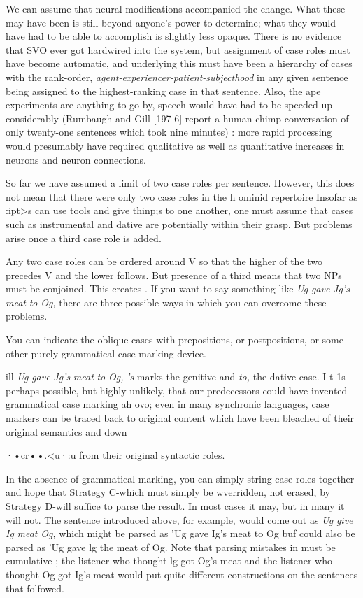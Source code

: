We can assume that neural modifications accompanied the change. What these may have been is still beyond anyone's power to determine; what they would have had to be able to accomplish is slightly less opaque. There is no evidence that SVO ever got hardwired into the system, but assignment of case roles must have become auto\-matic, and underlying this must have been a hierarchy of cases with the rank-order, \textit{agent-experiencer-patient-su}\textit{b}\textit{jecthood }in any given sen\-tence being assigned to the highest-ranking case in that sentence. Also, the ape experiments are anything to go by, speech would have had
to be speeded up considerably (Rumbaugh and Gill [197 6] report a human-chimp conversation of only twenty-one sentences which took nine minutes) : more rapid processing would presumably have required qualitative as well as quantitative increases in neurons and neuron connections.

So far we have assumed a limit of two case roles per sentence. However, this does not mean that there were only two case roles in the h ominid repertoire Insofar as :ipt{\textgreater}s can use tools and give thinp;s to one another, one must assume that cases such as instrumental and dative are potentially within their grasp. But problems arise once a third case role is added.

Any two case roles can be ordered around V so that the higher of the two precedes V and the lower follows. But presence of a third means that two NPs must be conjoined. This creates . If you want to say something like \textit{Ug} \textit{gave} \textit{Jg's} \textit{meat} \textit{to} \textit{Og,} there are three possible ways in which you can overcome these problems.

You can indicate the oblique cases with prepositions, or post\-positions, or some other purely grammatical case-marking device.


ill \textit{Ug} \textit{gave} \textit{Jg's} \textit{meat} \textit{to} \textit{Og,} \textit{'s} marks the genitive and \textit{to,} the dative case. I t 1s perhaps possible, but highly unlikely, that our predecessors could have invented grammatical case marking ah ovo; even in many syn\-chronic languages, case markers can be traced back to original content which have been bleached of their original semantics and down\-

·•cr••.{\textless}u·:u from their original syntactic roles.

In the absence of grammatical marking, you can simply string case roles together and hope that Strategy C-which must simply be wverridden, not erased, by Strategy D-will suffice to parse the result. In most cases it may, but in many it will not. The sentence introduced above, for example, would come out as \textit{Ug} \textit{give} \textit{Ig} \textit{meat} \textit{Og,} which might be parsed as 'Ug gave Ig's meat to Og buf could also be parsed as 'Ug gave lg the meat of Og. Note that parsing mistakes in  must be cumulative ; the listener who thought lg got Og's meat and the listener who thought Og got Ig's meat would put quite different con\-structions on the sentences that folfowed.

